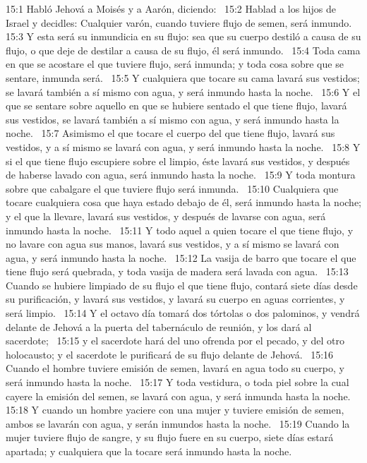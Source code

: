 15:1 Habló Jehová a Moisés y a Aarón, diciendo:  
15:2 Hablad a los hijos de Israel y decidles: Cualquier varón, cuando tuviere flujo de semen, será inmundo.  
15:3 Y esta será su inmundicia en su flujo: sea que su cuerpo destiló a causa de su flujo, o que deje de destilar a causa de su flujo, él será inmundo.  
15:4 Toda cama en que se acostare el que tuviere flujo, será inmunda; y toda cosa sobre que se sentare, inmunda será.  
15:5 Y cualquiera que tocare su cama lavará sus vestidos; se lavará también a sí mismo con agua, y será inmundo hasta la noche.  
15:6 Y el que se sentare sobre aquello en que se hubiere sentado el que tiene flujo, lavará sus vestidos, se lavará también a sí mismo con agua, y será inmundo hasta la noche.  
15:7 Asimismo el que tocare el cuerpo del que tiene flujo, lavará sus vestidos, y a sí mismo se lavará con agua, y será inmundo hasta la noche.  
15:8 Y si el que tiene flujo escupiere sobre el limpio, éste lavará sus vestidos, y después de haberse lavado con agua, será inmundo hasta la noche.  
15:9 Y toda montura sobre que cabalgare el que tuviere flujo será inmunda.  
15:10 Cualquiera que tocare cualquiera cosa que haya estado debajo de él, será inmundo hasta la noche; y el que la llevare, lavará sus vestidos, y después de lavarse con agua, será inmundo hasta la noche.  
15:11 Y todo aquel a quien tocare el que tiene flujo, y no lavare con agua sus manos, lavará sus vestidos, y a sí mismo se lavará con agua, y será inmundo hasta la noche.  
15:12 La vasija de barro que tocare el que tiene flujo será quebrada, y toda vasija de madera será lavada con agua.  
15:13 Cuando se hubiere limpiado de su flujo el que tiene flujo, contará siete días desde su purificación, y lavará sus vestidos, y lavará su cuerpo en aguas corrientes, y será limpio.  
15:14 Y el octavo día tomará dos tórtolas o dos palominos, y vendrá delante de Jehová a la puerta del tabernáculo de reunión, y los dará al sacerdote;  
15:15 y el sacerdote hará del uno ofrenda por el pecado, y del otro holocausto; y el sacerdote le purificará de su flujo delante de Jehová.  
15:16 Cuando el hombre tuviere emisión de semen, lavará en agua todo su cuerpo, y será inmundo hasta la noche.  
15:17 Y toda vestidura, o toda piel sobre la cual cayere la emisión del semen, se lavará con agua, y será inmunda hasta la noche.  
15:18 Y cuando un hombre yaciere con una mujer y tuviere emisión de semen, ambos se lavarán con agua, y serán inmundos hasta la noche.  
15:19 Cuando la mujer tuviere flujo de sangre, y su flujo fuere en su cuerpo, siete días estará apartada; y cualquiera que la tocare será inmundo hasta la noche.  
